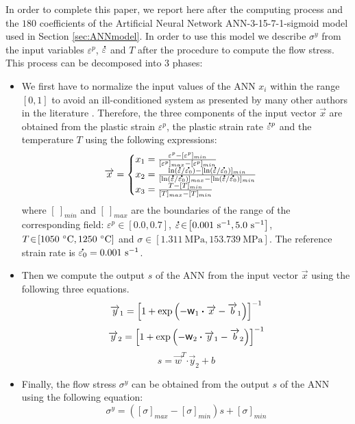 \documentclass[twoside,english,1p,final,sort&compress]{elsarticle}
\theoremstyle{plain}
\DeclareRobustCommand{\w}{\mbox{\large\ensuremath{\mathsf{w}}}}
\DeclareRobustCommand{\dotp}{\boldsymbol{\cdot}}
\DeclareRobustCommand{\mdot}[1]{\accentset{\mbox{\bfseries .}}{#1}}
\DeclareRobustCommand{\ps}{\text{s}^{-1}}
\DeclareRobustCommand{\MPa}{\text{MPa}}
\begin{document}
In order to complete this paper, we report here after the computing process and the $180$ coefficients of the Artificial Neural Network ANN-3-15-7-1-sigmoid model used in Section \ref{sec:ANNmodel}.
In order to use this model we describe $\sigma^y$ from the input variables $\varepsilon^p$, $\mdot\varepsilon$ and $T$ after the procedure to compute the flow stress. This process can be decomposed into 3 phases:
\begin{itemize}
\item We first have to normalize the input values of the ANN $x_i$ within the range $[0,1]$ to avoid an ill-conditioned system as presented by many other authors in the literature \cite{Lin-2008-ANN, Lu-2011-ANN}.
Therefore, the three components of the input vector $\overrightarrow{x}$ are obtained from the plastic strain $\varepsilon^p$, the plastic strain rate $\mdot{\varepsilon}^p$ and the temperature $T$ using the following expressions:
\begin{equation}
\overrightarrow{x}=
\begin{cases}
x_1 = \frac{\varepsilon^p - [\varepsilon^p]_{min}}{[\varepsilon^p]_{max} - [\varepsilon^p]_{min}}\\
x_2 = \frac{\ln(\mdot{\varepsilon}/\mdot{\varepsilon_0})-[\ln(\mdot{\varepsilon}/\mdot{\varepsilon_0})]_{min}}{[\ln(\mdot{\varepsilon}/\mdot{\varepsilon_0})]_{max}-[\ln(\mdot{\varepsilon}/\mdot{\varepsilon_0})]_{min}}\label{eq:CR1}\\
x_3 = \frac{T-[T]_{min}}{[T]_{max}-[T]_{min}}
\end{cases}
\end{equation}
where $[~]_{min}$ and $[~]_{max}$  are the boundaries of the range of the corresponding field: $\varepsilon^p\!\in\!\left[0.0,0.7\right]$, $\mdot{\varepsilon}\!\in\!\left[0.001~\ps,5.0~\ps\right]$, $T\!\in\!\left[1050~\celsius,1250~\celsius\right]$ and $\sigma\!\in\!\left[1.311~\MPa,153.739~\MPa\right]$.
The reference strain rate is $\mdot{\varepsilon_0} = 0.001~\ps$.
\item Then we compute the output $s$ of the ANN from the input vector $\overrightarrow{x}$ using the  following three equations.
\begin{equation}
\overrightarrow{y}_1 = \left[1 + \exp{\left(- \w_1 \dotp \overrightarrow{x}- \overrightarrow{b}_1\right)}\right]^{-1}
\end{equation}
\begin{equation}
\overrightarrow{y}_2 = \left[1 + \exp{\left(- \w_2 \dotp \overrightarrow{y}_1- \overrightarrow{b}_2\right)}\right]^{-1}
\end{equation}
\begin{equation}
s = \overrightarrow{w}^T \dotp \overrightarrow{y}_2 + b
\end{equation}
\item Finally, the flow stress $\sigma^y$ can be obtained from the output $s$ of the ANN using the following equation:
\begin{equation}
\sigma^y =  \left([\sigma]_{max}-[\sigma]_{min}\right)s + [\sigma]_{min} \label{eq:CR2}
\end{equation}
\end{itemize}
\end{document}

